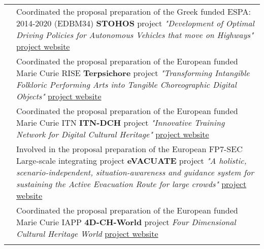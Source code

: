 \documentclass[a4paper,10pt]{article}
\begin{document}
\begin{longtable}{r p{11cm}}
&Coordinated the proposal preparation of the Greek funded ESPA: 2014-2020 (EDBM34) \textbf{STOHOS} project \small{\textit{"Development of Optimal Driving Policies for Autonomous Vehicles that move on Highways"} \href{http://http://stohos.tuc.gr}{project website}} \vspace{0.05in}\\

&Coordinated the proposal preparation of the European funded Marie Curie RISE \textbf{Terpsichore} project \small{\textit{"Transforming Intangible Folkloric Performing Arts into Tangible Choreographic Digital Objects"} \href{http://terpsichore-project.eu}{project website}} \vspace{0.05in}\\

&Coordinated the proposal preparation of the European funded Marie Curie ITN \textbf{ITN-DCH} project \small{\textit{"Innovative Training Network for Digital Cultural Heritage"} \href{http://www.itn-dch.eu}{project website}} \vspace{0.05in}\\

&Involved in the proposal preparation of the European FP7-SEC Large-scale integrating project \textbf{eVACUATE} project \small{\textit{"A holistic, scenario-independent, situation-awareness and guidance system for sustaining the Active Evacuation Route for large crowds"} \href{http://www.evacuate.eu}{project website}} \vspace{0.05in}\\

&Coordinated the proposal preparation of the European funded Marie Curie IAPP \textbf{4D-CH-World} project \small{\textit{Four Dimensional Cultural Heritage World} \href{http://www.4d-ch-world.eu}{project website}} \\

\vspace{0.01in}\\


\end{longtable}
\end{document}
